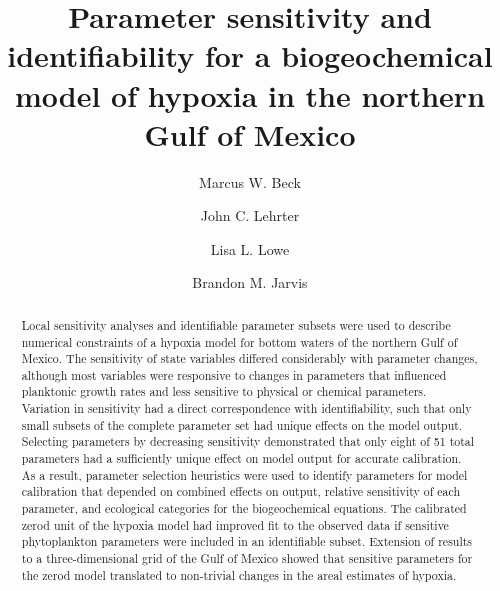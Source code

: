 \documentclass[review]{elsarticle}\usepackage[]{graphicx}\usepackage[]{color}
\begin{document}
\large

\begin{frontmatter}

\title{Parameter sensitivity and identifiability for a biogeochemical model of hypoxia in the northern {G}ulf of {M}exico}

\date{}

\author{Marcus W. Beck}
\address{USEPA National Health and Environmental Effects Research Laboratory, Gulf Ecology Division, 1 Sabine Island Drive, Gulf Breeze, FL 32561}

\author{John C. Lehrter}
\address{University of South Alabama, Dauphin Island Sea Lab, Dauphin Island, AL 36528}

\author{Lisa L. Lowe}
\address{CSRA, Inc. supporting the USEPA, Research Triangle Park, NC 27709}

\author{Brandon M. Jarvis}
\address{USEPA National Health and Environmental Effects Research Laboratory, Gulf Ecology Division, 1 Sabine Island Drive, Gulf Breeze, FL 32561}



\begin{abstract}
\noindent Local sensitivity analyses and identifiable parameter subsets were used to describe numerical constraints of a hypoxia model for bottom waters of the northern Gulf of Mexico.  The sensitivity of state variables differed considerably with parameter changes, although most variables were responsive to changes in parameters that influenced planktonic growth rates and less sensitive to physical or chemical parameters.  Variation in sensitivity had a direct correspondence with identifiability, such that only small subsets of the complete parameter set had unique effects on the model output. Selecting parameters by decreasing sensitivity demonstrated that only eight of 51 total parameters had a sufficiently unique effect on model output for accurate calibration.  As a result, parameter selection heuristics were used to identify parameters for model calibration that depended on combined effects on output, relative sensitivity of each parameter, and ecological categories for the biogeochemical equations. The calibrated \ac{zerod} unit of the hypoxia model had improved fit to the observed data if sensitive phytoplankton parameters were included in an identifiable subset.  Extension of results to a three-dimensional grid of the Gulf of Mexico showed that sensitive parameters for the \ac{zerod} model translated to non-trivial changes in the areal estimates of hypoxia.
\end{abstract}


\end{frontmatter}
\end{document}
